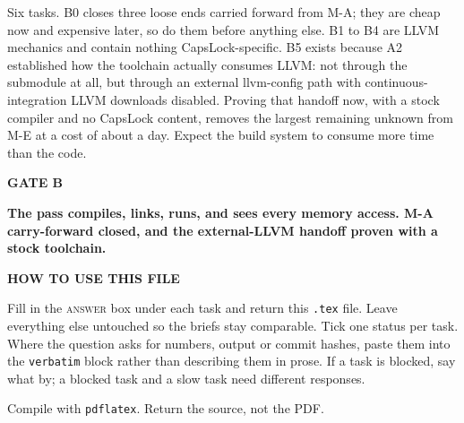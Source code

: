 \documentclass[11pt,a4paper]{article}
\begin{document}
\thispagestyle{fancy}

\par\vspace{2pt}

\par\vspace{8pt}

\begin{notebox}
Six tasks. B0 closes three loose ends carried forward from M-A; they are cheap now and expensive later, so do them before anything else. B1 to B4 are LLVM mechanics and contain nothing CapsLock-specific. B5 exists because A2 established how the toolchain actually consumes LLVM: not through the submodule at all, but through an external llvm-config path with continuous-integration LLVM downloads disabled. Proving that handoff now, with a stock compiler and no CapsLock content, removes the largest remaining unknown from M-E at a cost of about a day. Expect the build system to consume more time than the code.
\end{notebox}

\begin{gatebox}
{\scriptsize\bfseries\color{mute}GATE B}\par\vspace{2pt}
{\bfseries The pass compiles, links, runs, and sees every memory access. M-A carry-forward closed, and the external-LLVM handoff proven with a stock toolchain.}
\end{gatebox}

\begin{notebox}
{\scriptsize\bfseries\color{mute}HOW TO USE THIS FILE}\par\vspace{3pt}
Fill in the \textsc{answer} box under each task and return this \texttt{.tex} file. Leave everything else untouched so the briefs stay comparable. Tick one status per task. Where the question asks for numbers, output or commit hashes, paste them into the \texttt{verbatim} block rather than describing them in prose. If a task is blocked, say what by; a blocked task and a slow task need different responses.\par\vspace{4pt}
{\scriptsize\color{mute}Compile with \texttt{pdflatex}. Return the source, not the PDF.}
\end{notebox}
\end{document}
